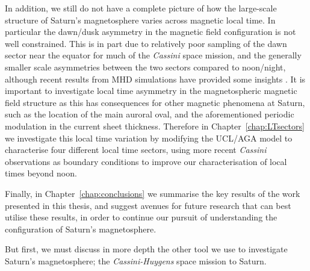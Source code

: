 In addition, we still do not have a complete picture of how the large-scale structure of Saturn's magnetosphere varies across magnetic local time. In particular the dawn/dusk asymmetry in the magnetic field configuration is not well constrained. This is in part due to relatively poor sampling of the dawn sector near the equator for much of the \textit{Cassini} space mission, and the generally smaller scale asymmetries between the two sectors compared to noon/night, although recent results from MHD simulations have provided some insights \citep[e.g.][]{jia2016}. It is important to investigate local time asymmetry in the magnetospheric magnetic field structure as this has consequences for other magnetic phenomena at Saturn, such as the location of the main auroral oval, and the aforementioned periodic modulation in the current sheet thickness. Therefore in Chapter~\ref{chap:LTsectors} we investigate this local time variation by modifying the UCL/AGA model to characterise four different local time sectors, using more recent \textit{Cassini} observations as boundary conditions to improve our characterisation of local times beyond noon.

Finally, in Chapter~\ref{chap:conclusions} we summarise the key results of the work presented in this thesis, and suggest avenues for future research that can best utilise these results, in order to continue our pursuit of understanding the configuration of Saturn's magnetosphere.

But first, we must discuss in more depth the other tool we use to investigate Saturn's magnetosphere; the \textit{Cassini-Huygens} space mission to Saturn.